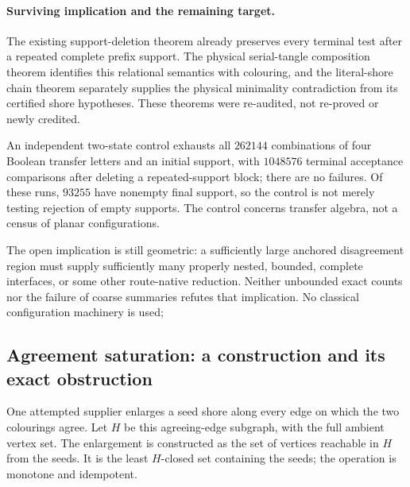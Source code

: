 \paragraph{Surviving implication and the remaining target.}
The existing support-deletion theorem already preserves every terminal
test after a repeated complete prefix support. The physical serial-tangle
composition theorem identifies this relational semantics with colouring,
and the literal-shore chain theorem separately supplies the physical
minimality contradiction from its certified shore hypotheses. These
theorems were re-audited, not re-proved or newly credited.

An independent two-state control exhausts all $262144$ combinations of
four Boolean transfer letters and an initial support, with $1048576$
terminal acceptance comparisons after deleting a repeated-support block;
there are no failures. Of these runs, $93255$ have nonempty final support,
so the control is not merely testing rejection of empty supports. The
control concerns transfer algebra, not a census of planar configurations.

The open implication is still geometric: a sufficiently large anchored
disagreement region must supply sufficiently many properly nested,
bounded, complete interfaces, or some other route-native reduction.
Neither unbounded exact counts nor the failure of coarse summaries
refutes that implication. No classical configuration machinery is used;
\subsection{Agreement saturation: a construction and its exact obstruction}
\label{sec:agreement-closed-cuts}

One attempted supplier enlarges a seed shore along every edge on which
the two colourings agree. Let $H$ be this agreeing-edge subgraph, with
the full ambient vertex set. The enlargement is constructed as the set
of vertices reachable in $H$ from the seeds. It is the least $H$-closed
set containing the seeds; the operation is monotone and idempotent.

